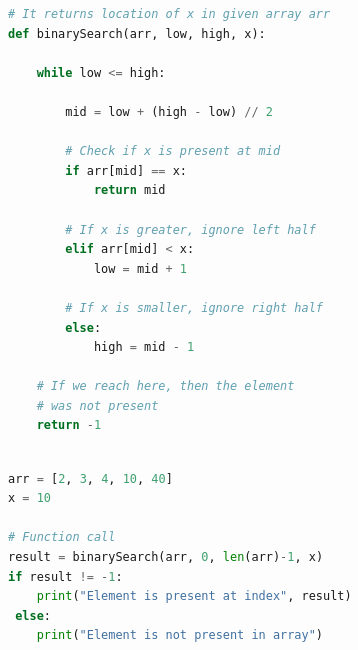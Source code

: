 \documentclass[aspectratio=1610]{beamer}
\begin{document}
\begin{frame}[fragile]
\begin{lstlisting}[language=Python]
# It returns location of x in given array arr
def binarySearch(arr, low, high, x):

    while low <= high:

        mid = low + (high - low) // 2

        # Check if x is present at mid
        if arr[mid] == x:
            return mid

        # If x is greater, ignore left half
        elif arr[mid] < x:
            low = mid + 1

        # If x is smaller, ignore right half
        else:
            high = mid - 1

    # If we reach here, then the element
    # was not present
    return -1
\end{lstlisting}
\end{frame}


\begin{frame}[fragile]
\begin{lstlisting}[language=Python]

arr = [2, 3, 4, 10, 40]
x = 10

# Function call
result = binarySearch(arr, 0, len(arr)-1, x)
if result != -1:
    print("Element is present at index", result)
 else:
    print("Element is not present in array")
\end{lstlisting}
\end{frame}
\end{document}
